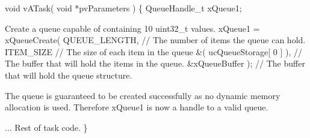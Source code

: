\begin{DoxyPre} void vATask( void *pvParameters )
 \{
 QueueHandle\_t xQueue1;\end{DoxyPre}



\begin{DoxyPre}Create a queue capable of containing 10 uint32\_t values.
    xQueue1 = xQueueCreate( QUEUE\_LENGTH, // The number of items the queue can hold.
                            ITEM\_SIZE     // The size of each item in the queue
                            \&( ucQueueStorage[ 0 ] ), // The buffer that will hold the items in the queue.
                            \&xQueueBuffer ); // The buffer that will hold the queue structure.\end{DoxyPre}



\begin{DoxyPre}The queue is guaranteed to be created successfully as no dynamic memory
allocation is used.  Therefore xQueue1 is now a handle to a valid queue.\end{DoxyPre}



\begin{DoxyPre}... Rest of task code.
 \}
 \end{DoxyPre}
 